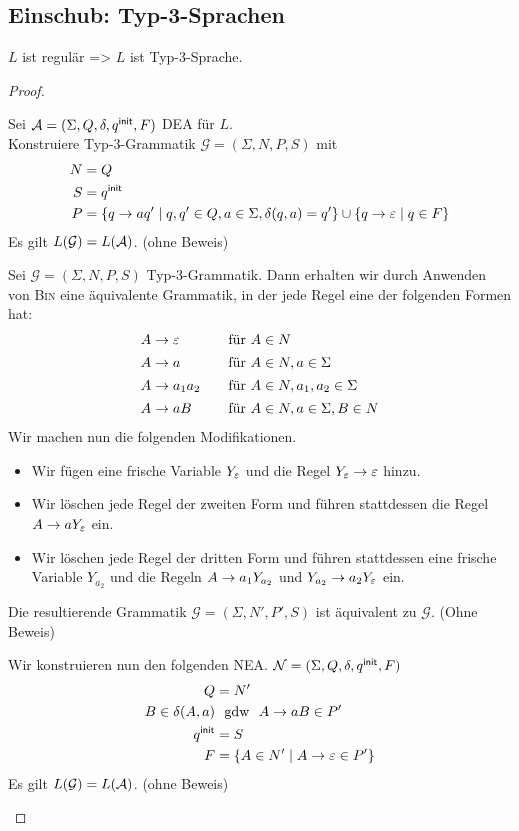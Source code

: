\subsection{Einschub: Typ-3-Sprachen}
\begin{Satz}[name={[Typ-3-Sprache ist regulär]}]
	$L$ ist regulär \<=> $L$ ist Typ-3-Sprache.
\end{Satz}
\begin{proof}
	\begin{description}[font=\normalfont,labelwidth=\widthof{"'\=>"':},leftmargin=!]
	\item["`\=>"'] Sei $\mathcal{A} =(\Sigma, Q,\delta,q^\mathsf{init},F)$ \ac{DEA} für $L$.\\
		Konstruiere Typ-3-Grammatik $\mathcal{G}=(\Sigma,N,P,S)$ mit
		\begin{align*}
		 N &= Q\\
		 S &= q^\mathsf{init}\\
		 P &= \{ q\rightarrow aq'\mid q,q'\in Q, a\in\Sigma, \delta(q,a)=q'\}\cup \{ q\rightarrow\varepsilon\mid q\in F\}
		\end{align*}
		Es gilt $L(\mathcal{G})=L(\mathcal{A})$. (ohne Beweis)
	\item["`\<="'] Sei $\mathcal{G}=(\Sigma,N,P,S)$ Typ-3-Grammatik.
	Dann erhalten wir durch Anwenden von \textsc{Bin} eine äquivalente Grammatik, in der jede Regel eine der folgenden Formen hat:
	  \begin{alignat*}{3}
	 A &\-> \Eps && \quad \text{für } A\in N\\[0.5mm]
   A &\-> a && \quad \text{für } A\in N, a\in\Sigma\\[0.5mm]
   A &\-> a_1a_2 && \quad \text{für } A\in N, a_1,a_2\in\Sigma\\[0.5mm]
   A &\-> aB && \quad \text{für } A\in N, a\in\Sigma, B\in N
  \end{alignat*}
  Wir machen nun die folgenden Modifikationen.
  \begin{itemize}
   \item Wir fügen eine frische Variable $Y_{\varepsilon}$ und die Regel $Y_{\varepsilon}\rightarrow\varepsilon$ hinzu.
   \item Wir löschen jede Regel der zweiten Form und führen stattdessen die Regel $A \-> aY_{\Eps}$ ein.
  \item Wir löschen jede Regel der dritten Form und führen stattdessen eine frische Variable $Y_{a_2}$ und die Regeln $A \-> a_1Y_{a_2}$ und $Y_{a_2} \-> a_2Y_\Eps$ ein.
  \end{itemize}
	Die resultierende Grammatik $\mathcal{G}=(\Sigma,N',P',S)$ ist äquivalent zu $\mathcal{G}$. (Ohne Beweis)

	Wir konstruieren nun den folgenden NEA. $\mathcal{N}=(\Sigma,Q,\delta,q^\mathsf{init},F)$
	\begin{alignat*}{2}
		Q &=N'\\
		B\in\delta(A,a) & \text{ \  gdw \ } A\rightarrow aB \in P'\\
		q^\mathsf{init} &=S\\
		F &= \{ A\in N'\mid A\rightarrow\varepsilon\in P'\}
	\end{alignat*}
		Es gilt $L(\mathcal{G})=L(\mathcal{A})$. (ohne Beweis) \qedhere

	\end{description}
\end{proof}


